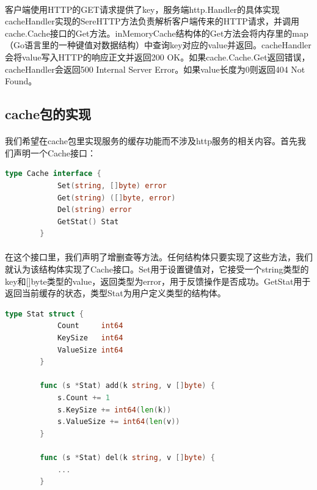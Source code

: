 \documentclass{article}
\begin{document}
	\paragraph{}
	客户端使用HTTP的GET请求提供了key，服务端http.Handler的具体实现cacheHandler实现的SereHTTP方法负责解析客户端传来的HTTP请求，并调用cache.Cache接口的Get方法。inMemoryCache结构体的Get方法会将内存里的map（Go语言里的一种键值对数据结构）中查询key对应的value并返回。cacheHandler会将value写入HTTP的响应正文并返回200 OK。如果cache.Cache.Get返回错误，cacheHandler会返回500 Internal Server Error。如果value长度为0则返回404 Not Found。
	\subsection{cache包的实现}
	\paragraph{}
	我们希望在cache包里实现服务的缓存功能而不涉及http服务的相关内容。首先我们声明一个Cache接口：
	\begin{lstlisting}[language=Go]
		type Cache interface {
			Set(string, []byte) error
			Get(string) ([]byte, error)
			Del(string) error
			GetStat() Stat
		}
	\end{lstlisting}
	\paragraph{}
	在这个接口里，我们声明了增删查等方法。任何结构体只要实现了这些方法，我们就认为该结构体实现了Cache接口。Set用于设置键值对，它接受一个string类型的key和[]byte类型的value，返回类型为error，用于反馈操作是否成功。GetStat用于返回当前缓存的状态，类型Stat为用户定义类型的结构体。
	\begin{lstlisting}[language=Go]
		type Stat struct {
			Count     int64
			KeySize   int64
			ValueSize int64
		}
		
		func (s *Stat) add(k string, v []byte) {
			s.Count += 1
			s.KeySize += int64(len(k))
			s.ValueSize += int64(len(v))
		}
		
		func (s *Stat) del(k string, v []byte) {
			...
		}
	\end{lstlisting}
\end{document}

